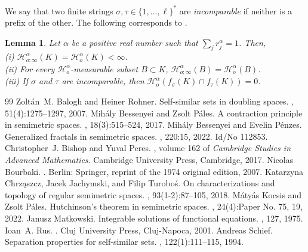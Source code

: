 \documentclass[10pt,a4paper]{amsart}
\newtheorem{Lem}[Thm]{Lemma}
\begin{document}
We say that two finite strings $\sigma, \tau \in \{1,\dots, \ell\}^{*}$ are {\it incomparable} if neither is a prefix of the other.  
The following corresponds to \cite[Proposition 2.1.3]{BishopPeres2017}. 

\begin{Lem}\label{lem:open-Haus-basic}
Let $\alpha$ be a positive real number such that $\sum_j r_j^{\alpha} = 1$. 
Then,\\
(i) $\mathcal{H}^{\alpha}_{o;\infty}(K) = \mathcal{H}^{\alpha}_{o}(K) < \infty$. \\
(ii) For every $ \mathcal{H}^{\alpha}_{o}$-measurable subset $B \subset K$, $\mathcal{H}^{\alpha}_{o;\infty}(B) = \mathcal{H}^{\alpha}_{o}(B)$. \\
(iii) If $\sigma$ and $\tau$ are incomparable, then $\mathcal{H}^{\alpha}_{o} \left(f_{\sigma}(K) \cap f_{\tau}(K) \right) = 0$. 
\end{Lem}

\begin{thebibliography}{99}
 Zolt\'an~M. Balogh and Heiner Rohner. \newblock Self-similar sets in doubling spaces. , 51(4):1275--1297, 2007.
 Mih\'aly Bessenyei and Zsolt P\'ales. \newblock A contraction principle in semimetric spaces. , 18(3):515--524, 2017.
 Mih{\'a}ly Bessenyei and Evelin P{\'e}nzes. \newblock Generalized fractals in semimetric spaces. , 220:15, 2022. \newblock Id/No 112853.
 Christopher~J. Bishop and Yuval Peres. , volume 162 of {\em Cambridge Studies in Advanced Mathematics}. \newblock Cambridge University Press, Cambridge, 2017.
 Nicolas Bourbaki. . \newblock Berlin: Springer, reprint of the 1974 original edition, 2007.
 Katarzyna Chrz{\k{a}}szcz, Jacek Jachymski, and Filip Turobo{\'s}. \newblock On characterizations and topology of regular semimetric spaces. , 93(1-2):87--105, 2018.
 M\'aty\'as Kocsis and Zsolt P\'ales. \newblock Hutchinson's theorem in semimetric spaces. , 24(4):Paper No. 75, 19, 2022.
 Janusz Matkowski. \newblock Integrable solutions of functional equations. , 127, 1975.
 Ioan~A. Rus. . \newblock Cluj University Press, Cluj-Napoca, 2001.
 Andreas Schief. \newblock Separation properties for self-similar sets. , 122(1):111--115, 1994.
\end{thebibliography}
\end{document}
